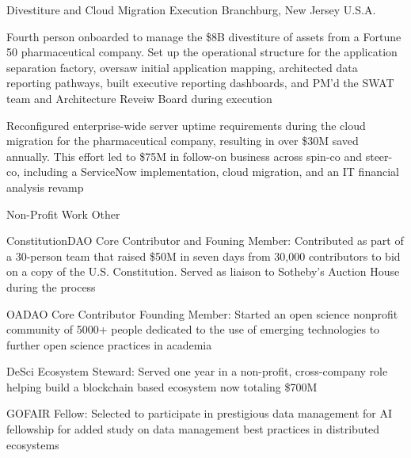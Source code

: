 \begin{cventries}
  \cventry
    {Divestiture and Cloud Migration Execution} %
    {} %
    {} %
    {Branchburg, New Jersey U.S.A.} %
    {
      \begin{cvitems} %
        \item {Fourth person onboarded to manage the \$8B divestiture of assets from a Fortune 50 pharmaceutical company. Set up the operational structure for the application separation factory, oversaw initial application mapping, architected data reporting pathways, built executive reporting dashboards, and PM’d the SWAT team and Architecture Reveiw Board during execution}
        \item {Reconfigured enterprise-wide server uptime requirements during the cloud migration for the pharmaceutical company, resulting in over \$30M saved annually. This effort led to \$75M in follow-on business across spin-co and steer-co, including a ServiceNow implementation, cloud migration, and an IT financial analysis revamp}
      \end{cvitems}
    }

  \cventry
    {Non-Profit Work} %
    {Other} %
    {} %
    {} %
    {
      \begin{cvitems} %
        \item {ConstitutionDAO Core Contributor and Founing Member: Contributed as part of a 30-person team that raised \$50M in seven days from 30,000 contributors to bid on a copy of the U.S. Constitution. Served as liaison to Sotheby’s Auction House during the process}
        \item {OADAO Core Contributor Founding Member: Started an open science nonprofit community of 5000+ people dedicated to the use of emerging technologies to further open science practices in academia}
        \item {DeSci Ecosystem Steward: Served one year in a non-profit, cross-company role helping build a blockchain based ecosystem now totaling \$700M}
        \item {GOFAIR Fellow: Selected to participate in prestigious data management for AI fellowship for added study on data management best practices in distributed ecosystems}
      \end{cvitems}
    }

\end{cventries}
